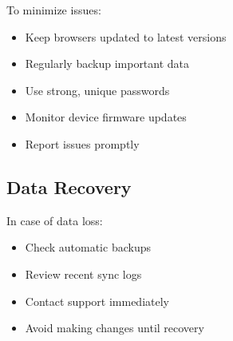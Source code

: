 To minimize issues:

\begin{itemize}
    \item Keep browsers updated to latest versions
    \item Regularly backup important data
    \item Use strong, unique passwords
    \item Monitor device firmware updates
    \item Report issues promptly
\end{itemize}

\subsection{Data Recovery}

In case of data loss:

\begin{itemize}
    \item Check automatic backups
    \item Review recent sync logs
    \item Contact support immediately
    \item Avoid making changes until recovery
\end{itemize}
